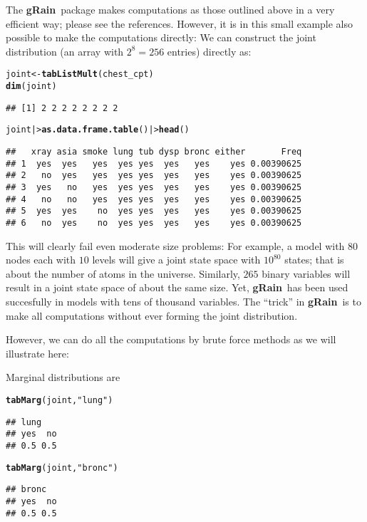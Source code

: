 \documentclass[10pt]{article}\usepackage[]{graphicx}\usepackage[]{xcolor}
\makeatletter
\newcommand{\hlstr}[1]{\textcolor[rgb]{0.192,0.494,0.8}{#1}}%
\newcommand{\hlstd}[1]{\textcolor[rgb]{0.345,0.345,0.345}{#1}}%
\newcommand{\hlkwb}[1]{\textcolor[rgb]{0.69,0.353,0.396}{#1}}%
\newcommand{\hlkwd}[1]{\textcolor[rgb]{0.737,0.353,0.396}{\textbf{#1}}}%
\newenvironment{kframe}{%
 \def\at@end@of@kframe{}%
 \ifinner\ifhmode%
  \def\at@end@of@kframe{\end{minipage}}%
  \begin{minipage}{\columnwidth}%
 \fi\fi%
 \def\FrameCommand##1{\hskip\@totalleftmargin \hskip-\fboxsep
 \colorbox{shadecolor}{##1}\hskip-\fboxsep
     \hskip-\linewidth \hskip-\@totalleftmargin \hskip\columnwidth}%
 \MakeFramed {\advance\hsize-\width
   \@totalleftmargin\z@ \linewidth\hsize
   \@setminipage}}%
 {\par\unskip\endMakeFramed%
 \at@end@of@kframe}
\newenvironment{knitrout}{}{} %
\def\grbn{{\bf gRain}}
\makeatother
\begin{document}
The \grbn\ package makes computations as those outlined above in a
very efficient way; please see the references.  However, it is in this
small example also possible to make the computations directly: We can
construct the joint distribution (an array with $2^8=256$ entries) directly as:
\begin{knitrout}
\color{fgcolor}\begin{kframe}
\begin{alltt}
\hlstd{joint} \hlkwb{<-} \hlkwd{tabListMult}\hlstd{(chest_cpt)}
\hlkwd{dim}\hlstd{(joint)}
\end{alltt}
\begin{verbatim}
## [1] 2 2 2 2 2 2 2 2
\end{verbatim}
\begin{alltt}
\hlstd{joint  |>} \hlkwd{as.data.frame.table}\hlstd{() |>} \hlkwd{head}\hlstd{()}
\end{alltt}
\begin{verbatim}
##   xray asia smoke lung tub dysp bronc either       Freq
## 1  yes  yes   yes  yes yes  yes   yes    yes 0.00390625
## 2   no  yes   yes  yes yes  yes   yes    yes 0.00390625
## 3  yes   no   yes  yes yes  yes   yes    yes 0.00390625
## 4   no   no   yes  yes yes  yes   yes    yes 0.00390625
## 5  yes  yes    no  yes yes  yes   yes    yes 0.00390625
## 6   no  yes    no  yes yes  yes   yes    yes 0.00390625
\end{verbatim}
\end{kframe}
\end{knitrout}

This will clearly fail even moderate size problems: For example, a
model with $80$
nodes each with $10$
levels will give a joint state space with $10^{80}$
states; that is about the number of atoms in the universe. Similarly,
$265$
binary variables will result in a joint state space of about the same
size. Yet, \grbn\ has been used succesfully in models with tens of
thousand variables.  The ``trick'' in \grbn\ is to make all
computations without ever forming the joint distribution. 

However, we
can do all the computations by brute force methods as we will
illustrate here:

Marginal distributions are
\begin{knitrout}
\color{fgcolor}\begin{kframe}
\begin{alltt}
\hlkwd{tabMarg}\hlstd{(joint,} \hlstr{"lung"}\hlstd{)}
\end{alltt}
\begin{verbatim}
## lung
## yes  no 
## 0.5 0.5
\end{verbatim}
\begin{alltt}
\hlkwd{tabMarg}\hlstd{(joint,} \hlstr{"bronc"}\hlstd{)}
\end{alltt}
\begin{verbatim}
## bronc
## yes  no 
## 0.5 0.5
\end{verbatim}
\end{kframe}
\end{knitrout}
\end{document}
